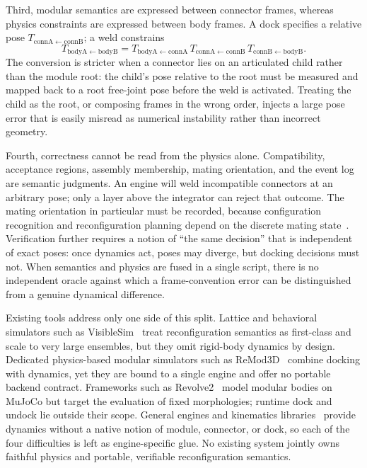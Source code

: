 Third, modular semantics are expressed between connector frames, whereas physics
constraints are expressed between body frames. A dock specifies a relative pose
\(T_{\mathrm{connA}\leftarrow\mathrm{connB}}\); a weld constrains
\[
T_{\mathrm{bodyA}\leftarrow\mathrm{bodyB}}
= T_{\mathrm{bodyA}\leftarrow\mathrm{connA}}\,
T_{\mathrm{connA}\leftarrow\mathrm{connB}}\,
T_{\mathrm{connB}\leftarrow\mathrm{bodyB}}.
\]
The conversion is stricter when a connector lies on an articulated child rather
than the module root: the child's pose relative to the root must be measured and
mapped back to a root free-joint pose before the weld is activated. Treating the
child as the root, or composing frames in the wrong order, injects a large pose
error that is easily misread as numerical instability rather than incorrect
geometry.

Fourth, correctness cannot be read from the physics alone. Compatibility,
acceptance regions, assembly membership, mating orientation, and the event log
are semantic judgments. An engine will weld incompatible connectors at an
arbitrary pose; only a layer above the integrator can reject that outcome. The
mating orientation in particular must be recorded, because configuration
recognition and reconfiguration planning depend on the discrete mating
state~\cite{liu2019distributed}. Verification further requires a notion of ``the
same decision'' that is independent of exact poses: once dynamics act, poses may
diverge, but docking decisions must not. When semantics and physics are fused in
a single script, there is no independent oracle against which a frame-convention
error can be distinguished from a genuine dynamical difference.

Existing tools address only one side of this split. Lattice and behavioral
simulators such as VisibleSim~\cite{thalamy2022visiblesim} treat reconfiguration
semantics as first-class and scale to very large ensembles, but they omit
rigid-body dynamics by design. Dedicated physics-based modular simulators such as
ReMod3D~\cite{collins2013remod3d} combine docking with dynamics, yet they are
bound to a single engine and offer no portable backend contract. Frameworks such
as Revolve2~\cite{hupkes2018revolve,revolve2software} model modular bodies on
MuJoCo but target the evaluation of fixed morphologies; runtime dock and undock
lie outside their scope. General engines and kinematics
libraries~\cite{pinciroli2012argos,iory_scikitrobot,coumans2021pybullet} provide
dynamics without a native notion of module, connector, or dock, so each of the
four difficulties is left as engine-specific glue. No existing system jointly
owns faithful physics and portable, verifiable reconfiguration semantics.

